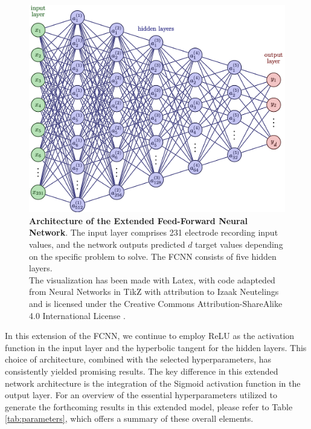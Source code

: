 \documentclass[a4paper, UKenglish, 11pt]{uiomaster}
\begin{document}
\begin{figure}[!htb]
    \centering
    \includegraphics[width=\linewidth]{figures/NN_multiple_outputs.png}
    \caption{\textbf{Architecture of the Extended Feed-Forward Neural Network}. The input layer comprises 231 electrode recording input values, and the network outputs predicted $d$ target values depending on the specific problem to solve. The FCNN consists of five hidden layers. \\
    The visualization has been made with Latex, with code adapteded from Neural Networks in TikZ with attribution to Izaak Neutelings and is licensed under the Creative Commons Attribution-ShareAlike 4.0 International License \cite{neutelings2021}.}
    \label{fig:NN_dipole_w_amplitude_architecture}
\end{figure}

In this extension of the FCNN, we continue to employ ReLU as the activation function in the input layer and the hyperbolic tangent for the hidden layers. This choice of architecture, combined with the selected hyperparameters, has consistently yielded promising results. The key difference in this extended network architecture is the integration of the Sigmoid activation function in the output layer. For an overview of the essential hyperparameters utilized to generate the forthcoming results in this extended model, please refer to Table \ref{tab:parameters}, which offers a summary of these overall elements.
\end{document}
